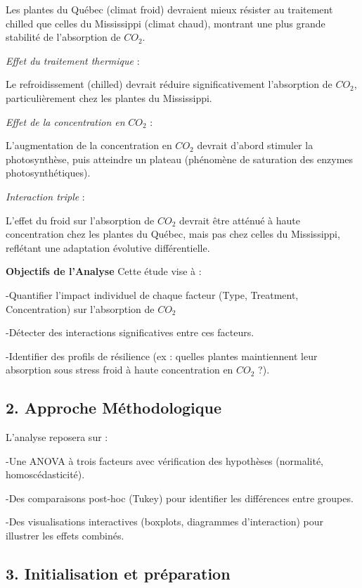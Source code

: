 \documentclass[
]{article}
\begin{document}
Les plantes du Québec (climat froid) devraient mieux résister au
traitement chilled que celles du Mississippi (climat chaud), montrant
une plus grande stabilité de l'absorption de \(CO_2\).

\emph{Effet du traitement thermique} :

Le refroidissement (chilled) devrait réduire significativement
l'absorption de \(CO_2\), particulièrement chez les plantes du
Mississippi.

\emph{Effet de la concentration en} \(CO_2\) :

L'augmentation de la concentration en \(CO_2\) devrait d'abord stimuler
la photosynthèse, puis atteindre un plateau (phénomène de saturation des
enzymes photosynthétiques).

\emph{Interaction triple} :

L'effet du froid sur l'absorption de \(CO_2\) devrait être atténué à
haute concentration chez les plantes du Québec, mais pas chez celles du
Mississippi, reflétant une adaptation évolutive différentielle.

\textbf{Objectifs de l'Analyse} Cette étude vise à :

-Quantifier l'impact individuel de chaque facteur (Type, Treatment,
Concentration) sur l'absorption de \(CO_2\)

-Détecter des interactions significatives entre ces facteurs.

-Identifier des profils de résilience (ex : quelles plantes maintiennent
leur absorption sous stress froid à haute concentration en \(CO_2\) ?).

\subsection{2. Approche
Méthodologique}\label{approche-muxe9thodologique}

L'analyse reposera sur :

-Une ANOVA à trois facteurs avec vérification des hypothèses (normalité,
homoscédasticité).

-Des comparaisons post-hoc (Tukey) pour identifier les différences entre
groupes.

-Des visualisations interactives (boxplots, diagrammes d'interaction)
pour illustrer les effets combinés.

\subsection{3. Initialisation et
préparation}\label{initialisation-et-pruxe9paration}
\end{document}
